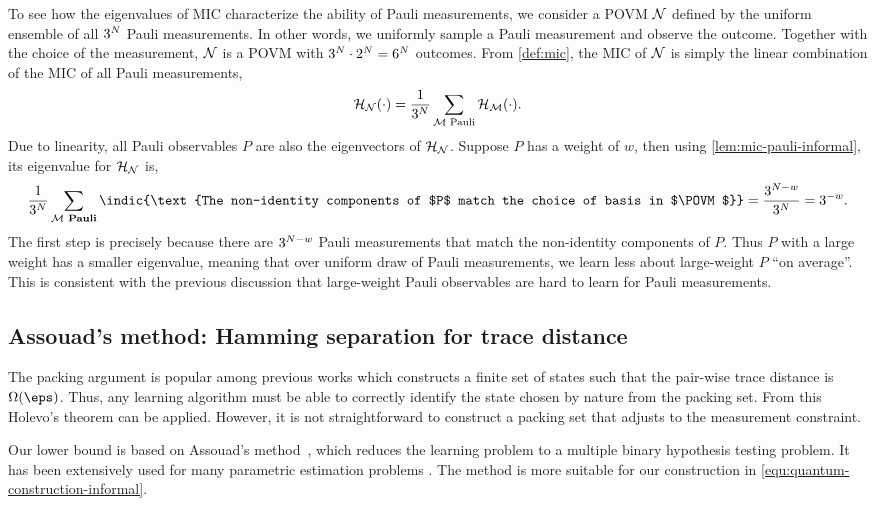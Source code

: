 To see how the eigenvalues of MIC characterize the ability of Pauli measurements, we consider a POVM $\mathcal{N}$ defined by the uniform ensemble of all $3^{{N}}$ Pauli measurements. In other words, we uniformly sample a Pauli measurement and observe the outcome. Together with the choice of the measurement, $\mathcal{N}$ is a POVM with $3^{{N}}\cdot 2^{{N}}=6^{{N}}$ outcomes. From \cref{def:mic}, the MIC of $\mathcal{N}$ is simply the linear combination of the MIC of all Pauli measurements,
\[
\mathcal{H}_{\mathcal{N}}(\cdot) = \frac{1}{3^{{N}}}\sum_{\mathcal{M} \text{ Pauli}}\mathcal{H}_{\mathcal{M}}(\cdot).
\]
Due to linearity, all Pauli observables $P$ are also the eigenvectors of $\mathcal{H}_{\mathcal{N}}$. Suppose $P$ has a weight of $w$, then using \cref{lem:mic-pauli-informal}, its eigenvalue for $\mathcal{H}_{\mathcal{N}}$ is,
\[
\frac{1}{3^{\nqubits}}\sum_{\POVM \textbf{ Pauli}}\indic{\text{The non-identity components of $P$ match the choice of basis in $\POVM$}}=\frac{3^{\nqubits-w}}{3^{\nqubits}}=3^{-w}.
\]
The first step is precisely because there are $3^{{N}-w}$ Pauli measurements that match the non-identity components of $P$. Thus $P$ with a large weight has a smaller eigenvalue,  meaning that over uniform draw of Pauli measurements, we learn less about large-weight $P$ ``on average''. This is consistent with the previous discussion that large-weight Pauli observables are hard to learn for Pauli measurements.

\subsection{Assouad's method: Hamming separation for trace distance}
The packing argument is popular among previous works \cite{HaahHJWY17, ODonnellW16} which constructs a finite set of states such that the pair-wise trace distance is $\Omega(\eps)$. 
Thus, any learning algorithm must be able to correctly identify the state chosen by nature from the packing set. 
From this Holevo's theorem can be applied. However, it is not straightforward to construct a packing set that adjusts to the measurement constraint. 

Our lower bound is based on Assouad's method~\cite{Assouad83,yu1997assouad}, which reduces the learning problem to a multiple binary hypothesis testing problem. It has been extensively used for many parametric estimation problems \cite{duchi2013local,ACLST22iiuic}. The method is more suitable for our construction in \eqref{equ:quantum-construction-informal}.

